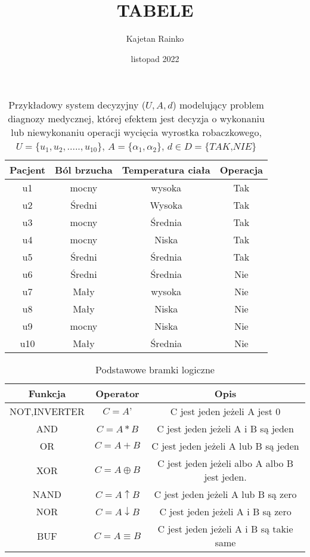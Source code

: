 \documentclass[a4paper]{article}
\title{TABELE}
\author{Kajetan Rainko}
\date {listopad 2022}
\begin{document}
\maketitle
\newpage
\begin{table}[h]
\centering\caption{Przykładowy system decyzyjny ($U,A,d$) modelujący problem diagnozy medycznej, której efektem jest decyzja o wykonaniu lub niewykonaniu operacji wycięcia wyrostka robaczkowego, $U=\{u_{1}, u_{2},.....,u_{10}\}$, $A=\{\alpha_{1},\alpha_{2}\}$, $d \in D=\{\textit{TAK,NIE}\}$}
\begin{tabular}{cccc}
\hline
\hline
Pacjent & Ból brzucha & Temperatura ciała & Operacja\\
\hline
u1 & mocny & wysoka & Tak\\
u2 & Średni & Wysoka & Tak \\
u3 & mocny & Średnia & Tak \\
u4 & mocny & Niska & Tak \\
u5 & Średni & Średnia & Tak \\
u6 & Średni & Średnia & Nie \\
u7 & Mały & wysoka & Nie \\
u8 & Mały & Niska & Nie \\
u9 & mocny & Niska & Nie \\
u10 & Mały & Średnia& Nie \\
\hline
\hline
\end{tabular}
\end{table}
\begin{table}[h]
\centering\caption{Podstawowe bramki logiczne}
\begin{tabular}{c|c|c}
\hline
\hline
Funkcja & Operator & Opis\\
\hline
NOT,INVERTER & $C=A’ $& C jest jeden jeżeli A jest 0 \\
AND & $C=A*B $& C jest jeden jeżeli A i B są jeden  \\
OR & $C=A+B $& C jest jeden jeżeli A lub B są jeden \\
XOR & $C=A \oplus B $& C jest jeden jeżeli albo A albo B jest jeden. \\
NAND &$ C=A\uparrow B $& C jest jeden jeżeli A lub B są zero  \\
NOR &$ C=A\downarrow B$ & C jest jeden jeżeli A i B są zero \\
BUF &$ C=A\equiv B $& C jest jeden jeżeli A i B są takie same \\

\hline
\hline
\end{tabular}
\end{table}
\end{document}
